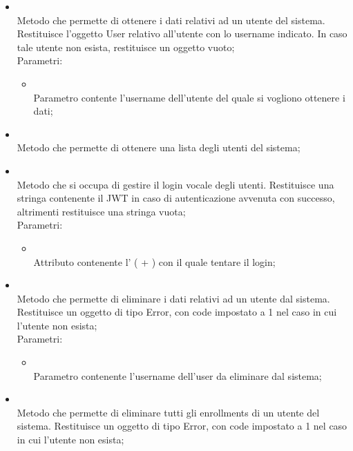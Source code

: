 \begin{itemize}
\begin{itemize}
		\item[]  \\
		Metodo che permette di ottenere i dati relativi ad un utente del sistema. Restituisce l'oggetto User relativo all'utente con lo username indicato. In caso tale utente non esista, restituisce un oggetto vuoto;\\
		Parametri:
		\begin{itemize}
			\item {} \\
			Parametro contente l'username dell'utente del quale si vogliono ottenere i dati;
		\end{itemize}
		\item[]  \\
		Metodo che permette di ottenere una lista degli utenti del sistema;\\
		\item[]  \\
		Metodo che si occupa di gestire il login vocale degli utenti. Restituisce una stringa contenente il JWT in caso di autenticazione avvenuta con successo, altrimenti restituisce una stringa vuota;\\
		Parametri:
		\begin{itemize}
			\item {} \\
			Attributo contenente l' ( + ) con il quale tentare il login;
		\end{itemize}
		\item[]  \\
		Metodo che permette di eliminare i dati relativi ad un utente dal sistema. Restituisce un oggetto di tipo Error, con code impostato a 1 nel caso in cui l'utente non esista;\\
		Parametri:
		\begin{itemize}
			\item {} \\
			Parametro contenente l'username dell'user da eliminare dal sistema;
		\end{itemize}
		\item[]  \\
		Metodo che permette di eliminare tutti gli enrollments di un utente del sistema. Restituisce un oggetto di tipo Error, con code impostato a 1 nel caso in cui l'utente non esista;\\

\end{itemize}
\end{itemize}
